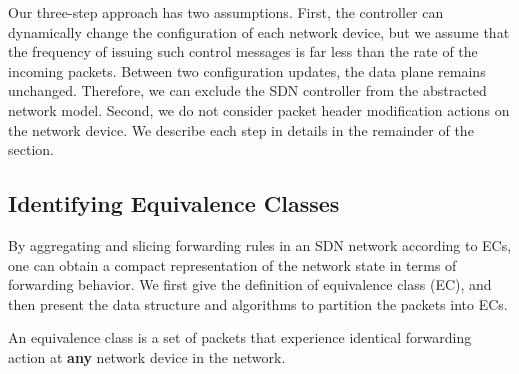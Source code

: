 Our three-step approach has two assumptions. First, the controller can dynamically change the configuration of each network device,
but we assume that the frequency of issuing such control messages is far less than the rate of the incoming packets.
Between two configuration updates, the data plane remains unchanged.
Therefore, we can exclude the SDN controller from the abstracted network model.
Second, we do not consider packet header modification actions on the network device.
We describe each step in details in the remainder of the section.


\subsection{Identifying Equivalence Classes}
\label{OBS:Sec:IdentifyEC}

By aggregating and slicing forwarding rules in an SDN network according to ECs, one can obtain a compact representation of the network state in terms of forwarding behavior.
We first give the definition of equivalence class (EC), and then present the data structure and algorithms to partition the packets into ECs.
\begin{definition}
    An equivalence class is a set of packets that experience identical forwarding action at \textbf{any} network device in the network.
    \label{OBS:Def:EC}
\end{definition}

